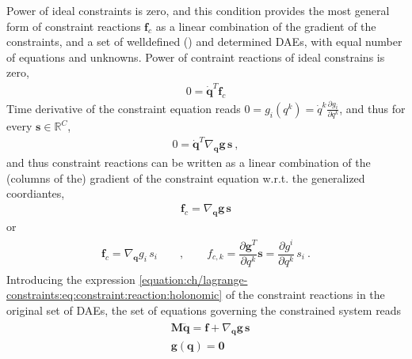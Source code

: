 \documentclass[letterpaper,10pt,english]{jupyterBook}
\begin{document}
\sphinxAtStartPar
{} Power of ideal constraints is zero, and this condition provides the most general form of constraint reactions \(\mathbf{f}_c\) as a linear combination of the gradient of the constraints, and a set of well\sphinxhyphen{}defined () and determined DAEs, with equal number of equations and unknowns. Power of contraint reactions of ideal constrains is zero,
\begin{equation*}
\begin{split}0 = \dot{\mathbf{q}}^T \mathbf{f}_c\end{split}
\end{equation*}
\sphinxAtStartPar
Time derivative of the constraint equation reads \(0 = g_i (q^k) = \dot{q}^k \frac{\partial g_i}{\partial q^k}\), and thus for every \(\mathbf{s} \in \mathbb{R}^C\),
\begin{equation}\label{equation:ch/lagrange-constraints:eq:constraint:reaction:holonomic}
\begin{split}0 = \dot{\mathbf{q}}^T \nabla_{\mathbf{q}} \mathbf{g} \, \mathbf{s} \ ,\end{split}
\end{equation}
\sphinxAtStartPar
and thus constraint reactions can be written as a linear combination of the (columns of the) gradient of the constraint equation w.r.t. the generalized coordiantes,
\begin{equation*}
\begin{split}\mathbf{f}_c = \nabla_\mathbf{q} \mathbf{g} \, \mathbf{s}\end{split}
\end{equation*}
\sphinxAtStartPar
or
\begin{equation*}
\begin{split}\begin{aligned}
  \mathbf{f}_c = \nabla_{\mathbf{q}} g_i \, s_i \qquad , \qquad
  f_{c,k}      = \dfrac{\partial\mathbf{g}^T}{\partial q^k} \mathbf{s} = \dfrac{\partial g^i}{\partial q^k} \, s_i \ .
\end{aligned}\end{split}
\end{equation*}
\sphinxAtStartPar
{} Introducing the expression \eqref{equation:ch/lagrange-constraints:eq:constraint:reaction:holonomic} of the constraint reactions in the original set of DAEs, the set of equations governing the constrained system reads
\begin{equation*}
\begin{split}\begin{aligned}
  & \mathbf{M} \ddot{\mathbf{q}} = \mathbf{f} + \nabla_{\mathbf{q}} \mathbf{g} \, \mathbf{s} \\
  & \mathbf{g}(\mathbf{q}) = \mathbf{0}
\end{aligned}\end{split}
\end{equation*}
\end{document}
